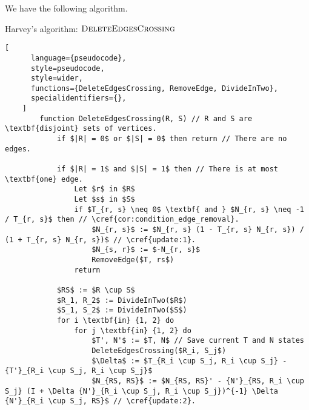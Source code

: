 We have the following algorithm.

\begin{programruledcaption}{Harvey's algorithm: \(\textsc{DeleteEdgesCrossing}\)}
    \begin{lstlisting}[
      language={pseudocode},
      style=pseudocode,
      style=wider,
      functions={DeleteEdgesCrossing, RemoveEdge, DivideInTwo},
      specialidentifiers={},
    ]
        function DeleteEdgesCrossing(R, S) // R and S are \textbf{disjoint} sets of vertices.
            if $|R| = 0$ or $|S| = 0$ then return // There are no edges.

            if $|R| = 1$ and $|S| = 1$ then // There is at most \textbf{one} edge.
                Let $r$ in $R$
                Let $s$ in $S$
                if $T_{r, s} \neq 0$ \textbf{ and } $N_{r, s} \neq -1 / T_{r, s}$ then // \cref{cor:condition_edge_removal}.
                    $N_{r, s}$ := $N_{r, s} (1 - T_{r, s} N_{r, s}) / (1 + T_{r, s} N_{r, s})$ // \cref{update:1}.
                    $N_{s, r}$ := $-N_{r, s}$
                    RemoveEdge($T, rs$)
                return

            $RS$ := $R \cup S$
            $R_1, R_2$ := DivideInTwo($R$)
            $S_1, S_2$ := DivideInTwo($S$)
            for i \textbf{in} {1, 2} do
                for j \textbf{in} {1, 2} do
                    $T', N'$ := $T, N$ // Save current T and N states
                    DeleteEdgesCrossing($R_i, S_j$)
                    $\Delta$ := $T_{R_i \cup S_j, R_i \cup S_j} - {T'}_{R_i \cup S_j, R_i \cup S_j}$
                    $N_{RS, RS}$ := $N_{RS, RS}' - {N'}_{RS, R_i \cup S_j} (I + \Delta {N'}_{R_i \cup S_j, R_i \cup S_j})^{-1} \Delta {N'}_{R_i \cup S_j, RS}$ // \cref{update:2}.
    \end{lstlisting}
\end{programruledcaption}

